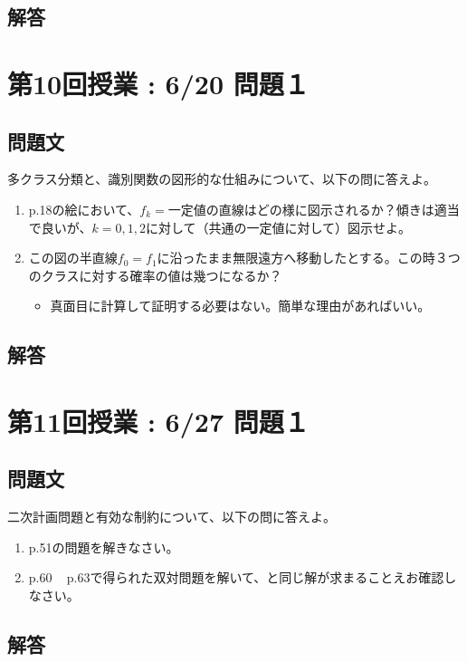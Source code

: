 \documentclass{article}[jsarticle]
\begin{document}
    \subsection{解答}

\section{第10回授業 : 6/20 問題１}

    \subsection{問題文}
    多クラス分類と、識別関数の図形的な仕組みについて、以下の問に答えよ。
    \begin{enumerate}
        \item p.18の絵において、$f_k = \text{一定値}$の直線はどの様に図示されるか？傾きは適当で良いが、$k = 0,1,2$に対して（共通の一定値に対して）図示せよ。
        \item この図の半直線$f_0 = f_1$に沿ったまま無限遠方へ移動したとする。この時３つのクラスに対する確率の値は幾つになるか？
        \begin{itemize}
            \item 真面目に計算して証明する必要はない。簡単な理由があればいい。
        \end{itemize}
    \end{enumerate}
    \subsection{解答}

\section{第11回授業 : 6/27 問題１}

    \subsection{問題文}
    二次計画問題と有効な制約について、以下の問に答えよ。
    \begin{enumerate}
        \item p.51の問題を解きなさい。
        \item p.60 ~ p.63で得られた双対問題を解いて、と同じ解が求まることえお確認しなさい。
    \end{enumerate}
    \subsection{解答}

    
\end{document}
